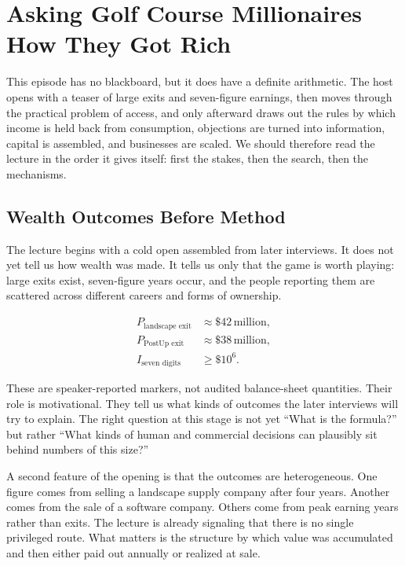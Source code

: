 \chapter{Asking Golf Course Millionaires How They Got Rich}

This episode has no blackboard, but it does have a definite arithmetic. The host opens with a teaser of large exits and seven-figure earnings, then moves through the practical problem of access, and only afterward draws out the rules by which income is held back from consumption, objections are turned into information, capital is assembled, and businesses are scaled. We should therefore read the lecture in the order it gives itself: first the stakes, then the search, then the mechanisms.

\section{Wealth Outcomes Before Method}

The lecture begins with a cold open assembled from later interviews. It does not yet tell us how wealth was made. It tells us only that the game is worth playing: large exits exist, seven-figure years occur, and the people reporting them are scattered across different careers and forms of ownership.

\begin{align}
P_{\text{landscape exit}} &\approx \$42\,\text{million},\\
P_{\text{PostUp exit}} &\approx \$38\,\text{million},\\
I_{\text{seven digits}} &\ge \$10^6.
\end{align}

These are speaker-reported markers, not audited balance-sheet quantities. Their role is motivational. They tell us what kinds of outcomes the later interviews will try to explain. The right question at this stage is not yet ``What is the formula?'' but rather ``What kinds of human and commercial decisions can plausibly sit behind numbers of this size?''

A second feature of the opening is that the outcomes are heterogeneous. One figure comes from selling a landscape supply company after four years. Another comes from the sale of a software company. Others come from peak earning years rather than exits. The lecture is already signaling that there is no single privileged route. What matters is the structure by which value was accumulated and then either paid out annually or realized at sale.

